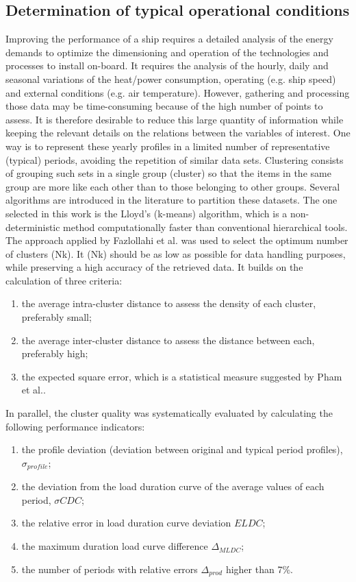 \documentclass[preprint,12pt]{elsarticle}
\begin{document}
\subsection{Determination of typical operational conditions} \label{sec:met:typicalDays}

Improving the performance of a ship requires a detailed analysis of the energy demands to optimize the dimensioning and operation of the technologies and processes to install on-board. It requires the analysis of the hourly, daily and seasonal variations of the heat/power consumption, operating (e.g. ship speed) and external conditions (e.g. air temperature). However, gathering and processing those data may be time-consuming because of the high number of points to assess. It is therefore desirable to reduce this large quantity of information while keeping the relevant details on the relations between the variables of interest. 
One way is to represent these yearly profiles in a limited number of representative (typical) periods, avoiding the repetition of similar data sets. Clustering consists of grouping such sets in a single group (cluster) so that the items in the same group are more like each other than to those belonging to other groups. Several algorithms are introduced in the literature to partition these datasets. The one selected in this work is the Lloyd’s (k-means) algorithm, which is a non-deterministic method computationally faster than conventional hierarchical tools. The approach applied by Fazlollahi et al. was used to select the optimum number of clusters (Nk). It (Nk) should be as low as possible for data handling purposes, while preserving a high accuracy of the retrieved data. It builds on the calculation of three criteria: 
\begin{enumerate}
	\item the average intra-cluster distance to assess the density of each cluster, preferably small;
	\item the average inter-cluster distance to assess the distance between each, preferably high; 
	\item the expected square error, which is a statistical measure suggested by Pham et al.. 
\end{enumerate}

In parallel, the cluster quality was systematically evaluated by calculating the following performance indicators:
\begin{enumerate}
	\item the profile deviation (deviation between original and typical period profiles),$\sigma_{profile}$;
	\item the deviation from the load duration curve of the average values of each period, $\sigma{CDC}$;
	\item the relative error in load duration curve deviation $ELDC$;
	\item the maximum duration load curve difference $\Delta_{MLDC}$;
	\item the number of periods with relative errors $\Delta_{prod}$ higher than 7\%.
\end{enumerate}
\end{document}
